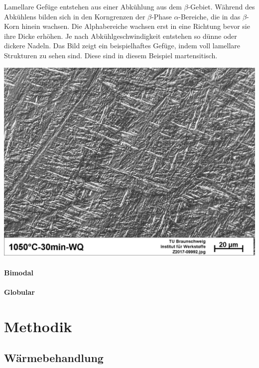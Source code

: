 \documentclass[a4paper, singlepage, 11pt]{tubsreprt}
\begin{document}
Lamellare Gefüge entstehen aus einer Abkühlung aus dem $\beta$-Gebiet. Während des Abkühlens bilden sich in den Korngrenzen der $\beta$-Phase $\alpha$-Bereiche, die in das $\beta$-Korn hinein wachsen. Die Alphabereiche wachsen erst in eine Richtung bevor sie ihre Dicke erhöhen. Je nach Abkühlgeschwindigkeit entstehen so dünne oder dickere Nadeln. Das Bild zeigt ein beispielhaftes Gefüge, indem voll lamellare Strukturen zu sehen sind. Diese sind in diesem Beispiel martensitisch. 

\begin{minipage}{\textwidth}


	\centering
		\includegraphics[scale=0.5]{Bilder/Vollmartensit.jpg}
		\label{fig1}
		
\end{minipage}

\subsubsection{Bimodal}
\subsubsection{Globular}
\chapter{Methodik}
\section{Wärmebehandlung}
\end{document}
